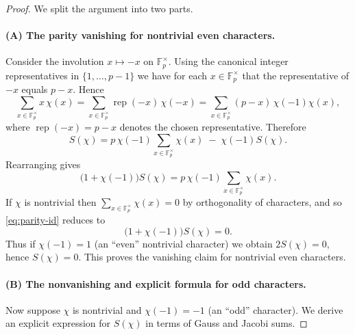 \documentclass[11pt,a4paper]{article}
\theoremstyle{plain}
\theoremstyle{definition}
\begin{document}
\begin{proof}
We split the argument into two parts.

\paragraph{(A) The parity vanishing for nontrivial even characters.}
Consider the involution $x\mapsto -x$ on $\mathbb{F}_p^\times$. Using the canonical integer representatives in $\{1,\dots,p-1\}$ we have for each $x\in\mathbb{F}_p^\times$ that the representative of $-x$ equals $p-x$. Hence
\[
\sum_{x\in\mathbb{F}_p^\times} x\,\chi(x)
=
\sum_{x\in\mathbb{F}_p^\times} \operatorname{rep}(-x)\,\chi(-x)
=
\sum_{x\in\mathbb{F}_p^\times} (p-x)\,\chi(-1)\chi(x),
\]
where $\operatorname{rep}(-x)=p-x$ denotes the chosen representative. Therefore
\[
S(\chi)=p\,\chi(-1)\sum_{x\in\mathbb{F}_p^\times}\chi(x)\;-\;\chi(-1)S(\chi).
\]
Rearranging gives
\begin{equation}\label{eq:parity-id}
\bigl(1+\chi(-1)\bigr)S(\chi)=p\,\chi(-1)\sum_{x\in\mathbb{F}_p^\times}\chi(x).
\end{equation}
If $\chi$ is nontrivial then $\sum_{x\in\mathbb{F}_p^\times}\chi(x)=0$ by orthogonality of characters, and so \eqref{eq:parity-id} reduces to
\[
\bigl(1+\chi(-1)\bigr)S(\chi)=0.
\]
Thus if $\chi(-1)=1$ (an ``even'' nontrivial character) we obtain $2S(\chi)=0$, hence $S(\chi)=0$. This proves the vanishing claim for nontrivial even characters.

\paragraph{(B) The nonvanishing and explicit formula for odd characters.}
Now suppose $\chi$ is nontrivial and $\chi(-1)=-1$ (an ``odd'' character). We derive an explicit expression for $S(\chi)$ in terms of Gauss and Jacobi sums.


\end{proof}
\end{document}
